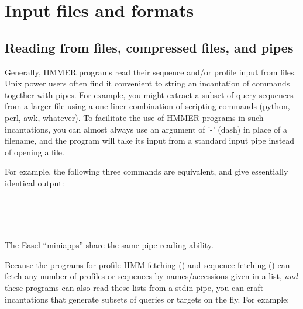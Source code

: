 \chapter{Input files and formats}
\label{chapter:formats}
\setcounter{footnote}{0}

\section{Reading from files, compressed files, and pipes}

Generally, HMMER programs read their sequence and/or profile input
from files. Unix power users often find it convenient to string an
incantation of commands together with pipes. For example, you might
extract a subset of query sequences from a larger file using a
one-liner combination of scripting commands (python, perl, awk,
whatever). To facilitate the use of HMMER programs in such
incantations, you can almost always use an argument of '-' (dash) in
place of a filename, and the program will take its input from a
standard input pipe instead of opening a file.

For example, the following three commands are equivalent, and give
essentially identical output:

   \vspace{1ex}
     \\
    \\
    \\
   \vspace{1ex}

The Easel ``miniapps'' share the same pipe-reading ability.

Because the programs for profile HMM fetching () and
sequence fetching () can fetch any number of profiles
or sequences by names/accessions given in a list, \emph{and} these
programs can also read these lists from a stdin pipe, you can craft
incantations that generate subsets of queries or targets on the
fly. For example:

   \vspace{1ex}
   \begin{fullwidth}
    \\
    \\
   \end{fullwidth}
   \vspace{1ex}

